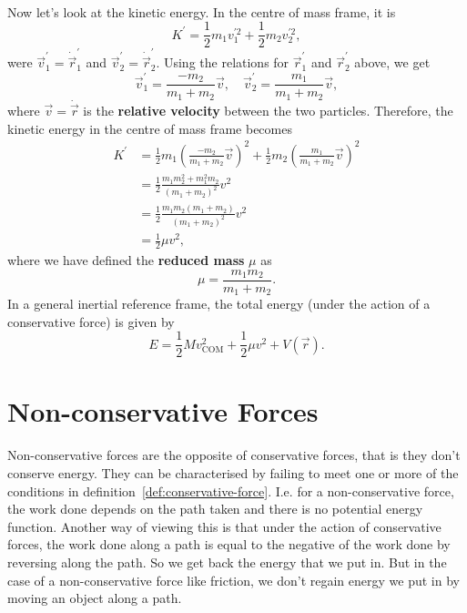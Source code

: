 \documentclass[../classical_mechanics.tex]{subfiles}
\begin{document}
        \paragraph{}
        Now let's look at the kinetic energy.
        In the centre of mass frame, it is
        \begin{equation}
            K^\prime=\frac{1}{2}m_1v_1^{\prime 2}+\frac{1}{2}m_2v_2^{\prime 2},
        \end{equation}
        were $\vec{v}_1^\prime=\dot{\vec{r}}_1^\prime$ and $\vec{v}_2^\prime=\dot{\vec{r}}_2^\prime$.
        Using the relations for $\vec{r}_1^\prime$ and $\vec{r}_2^\prime$ above, we get
        \begin{equation}
            \vec{v}_1^\prime=\frac{-m_2}{m_1+m_2}\vec{v},\quad\vec{v}_2^\prime=\frac{m_1}{m_1+m_2}\vec{v},
        \end{equation}
        where $\vec{v}=\dot{\vec{r}}$ is the \textbf{relative velocity} between the two particles.
        Therefore, the kinetic energy in the centre of mass frame becomes
        \begin{align}
            K^\prime&=\frac{1}{2}m_1\left(\frac{-m_2}{m_1+m_2}\vec{v}\right)^2+\frac{1}{2}m_2\left(\frac{m_1}{m_1+m_2}\vec{v}\right)^2\\
            &=\frac{1}{2}\frac{m_1m_2^2+m_1^2m_2}{(m_1+m_2)^2}v^2\\
            &=\frac{1}{2}\frac{m_1m_2(m_1+m_2)}{(m_1+m_2)^2}v^2\\
            &=\frac{1}{2}\mu v^2,
        \end{align}
        where we have defined the \textbf{reduced mass} $\mu$ as
        \begin{equation}
            \mu=\frac{m_1m_2}{m_1+m_2}.
        \end{equation}
        In a general inertial reference frame, the total energy (under the action of a conservative force) is given by
        \begin{equation}
            E=\frac{1}{2}Mv_\text{COM}^2+\frac{1}{2}\mu v^2+V(\vec{r}).
        \end{equation}

    \section{Non-conservative Forces}\label{sec:non-conservative-forces}
        \paragraph{}
        Non-conservative forces are the opposite of conservative forces, that is they don't conserve energy.
        They can be characterised by failing to meet one or more of the conditions in definition~\ref{def:conservative-force}.
        I.e. for a non-conservative force, the work done depends on the path taken and there is no potential energy function.
        Another way of viewing this is that under the action of conservative forces, the work done along a path is equal to the negative of the work done by reversing along the path.
        So we get back the energy that we put in.
        But in the case of a non-conservative force like friction, we don't regain energy we put in by moving an object along a path.
\end{document}
